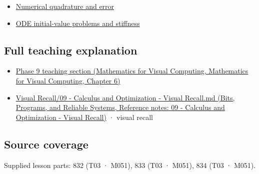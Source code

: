 \begin{itemize}
\tightlist
\item
  \hyperref[appendix-80521eae6b71]{Numerical quadrature and error}
\item
  \hyperref[appendix-e8ab9836882e]{ODE initial-value problems and stiffness}
\end{itemize}

\subsection{Full teaching explanation}\label{appendix-1a50e72435c2-full-teaching-explanation}

\begin{itemize}
\tightlist
\item
  \href{../02-Mathematics-for-Visual-Computing/main.pdf\#nameddest=02-foundations-ii-ch022-integration-and-quadrature}{Phase 9 teaching section (Mathematics for Visual Computing, Mathematics for Visual Computing, Chapter 6)}
\item
  \href{../01-Bits-Programs-and-Reliable-Systems/main.pdf\#nameddest=appendix-adf48f5dc5c1}{Visual Recall/09 - Calculus and Optimization - Visual Recall.md (Bits, Programs, and Reliable Systems, Reference notes: 09 - Calculus and Optimization - Visual Recall)} · visual recall
\end{itemize}

\subsection{Source coverage}\label{appendix-1a50e72435c2-source-coverage}

Supplied lesson parts: 832 (T03 · M051), 833 (T03 · M051), 834 (T03 · M051).
